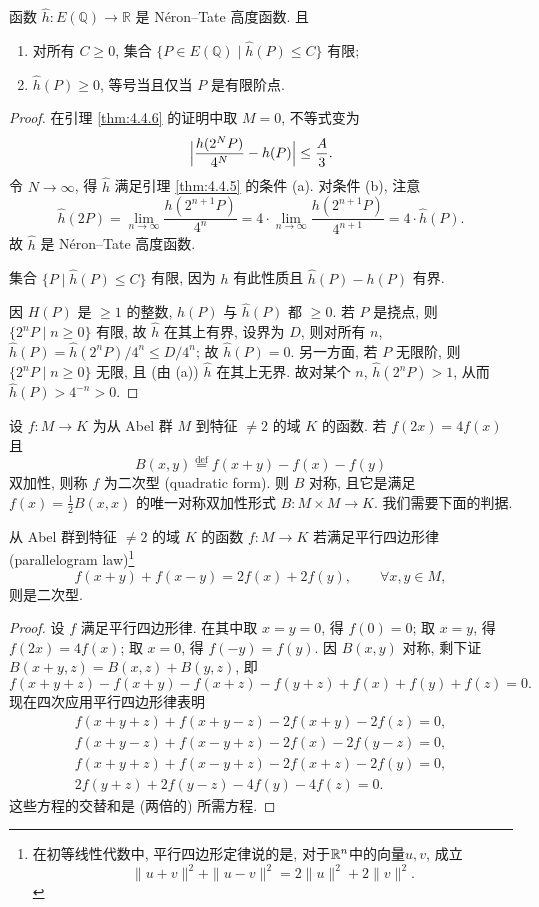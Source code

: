 \begin{theorem} \label{thm:4.4.7} 
函数 $\hat{h}\colon E(\mathbb{Q})\to\mathbb{R}$ 是 N\'eron--Tate 高度函数. 且
\begin{enumerate}[label=\textup{(\alph*)}]
\item 对所有 $C\ge 0$, 集合 $\{P\in E(\mathbb{Q}) \mid \hat{h}(P)\le C\}$ 有限;
\item $\hat{h}(P)\ge 0$, 等号当且仅当 $P$ 是有限阶点.
\end{enumerate}
\end{theorem}

\begin{proof}
在引理 \ref{thm:4.4.6} 的证明中取 $M = 0$, 不等式变为
\[
\Bigl|\frac{h(2^NP)}{4^N} - h(P)\Bigr|\le\frac{A}{3}.
\]
令 $N\to\infty$, 得 $\hat{h}$ 满足引理 \ref{thm:4.4.5} 的条件 (a). 对条件 (b), 注意
\[
\hat{h}(2P) = \lim_{n\to\infty}\frac{h(2^{n+1}P)}{4^n} = 4\cdot\lim_{n\to\infty}\frac{h(2^{n+1}P)}{4^{n+1}} = 4\cdot\hat{h}(P).
\]
故 $\hat{h}$ 是 N\'eron--Tate 高度函数.

集合 $\{P \mid \hat{h}(P)\le C\}$ 有限, 因为 $h$ 有此性质且 $\hat{h}(P) - h(P)$ 有界.

因 $H(P)$ 是 $\ge 1$ 的整数, $h(P)$ 与 $\hat{h}(P)$ 都 $\ge 0$. 若 $P$ 是挠点, 则 $\{2^nP \mid n\ge 0\}$ 有限, 故 $\hat{h}$ 在其上有界, 设界为 $D$, 则对所有 $n$, $\hat{h}(P) = \hat{h}(2^nP)/4^n\le D/4^n$; 故 $\hat{h}(P) = 0$. 另一方面, 若 $P$ 无限阶, 则 $\{2^nP \mid n\ge 0\}$ 无限, 且 (由 (a)) $\hat{h}$ 在其上无界. 故对某个 $n$, $\hat{h}(2^nP) > 1$, 从而 $\hat{h}(P) > 4^{-n} > 0$.
\end{proof}

设 $f\colon M\to K$ 为从 Abel 群 $M$ 到特征 $\neq 2$ 的域 $K$ 的函数. 若 $f(2x) = 4f(x)$ 且
\[
B(x, y) \overset{\text{def}}{=} f(x+y) - f(x) - f(y)
\]
双加性, 则称 $f$ 为二次型 (quadratic form). 则 $B$ 对称, 且它是满足 $f(x) = \frac{1}{2}B(x, x)$ 的唯一对称双加性形式 $B\colon M\times M\to K$. 我们需要下面的判据.

\begin{lemma} \label{thm:4.4.8} 
从 Abel 群到特征 $\neq 2$ 的域 $K$ 的函数 $f\colon M\to K$ 若满足平行四边形律 (parallelogram law)\footnote{在初等线性代数中, 平行四边形定律说的是, 对于$\mathbb{R}^n$中的向量$u,v$, 成立\[\|u+v\|^2 + \|u-v\|^2 = 2\|u\|^2+2\|v\|^2.\]}
\[
f(x+y) + f(x-y) = 2f(x) + 2f(y), \qquad \forall x, y\in M,
\]
则是二次型.
\end{lemma}

\begin{proof}
设 $f$ 满足平行四边形律. 在其中取 $x = y = 0$, 得 $f(0) = 0$; 取 $x = y$, 得 $f(2x) = 4f(x)$; 取 $x = 0$, 得 $f(-y) = f(y)$. 因 $B(x, y)$ 对称, 剩下证 $B(x+y, z) = B(x, z) + B(y, z)$, 即
\[
f(x+y+z) - f(x+y) - f(x+z) - f(y+z) + f(x) + f(y) + f(z) = 0.
\]
现在四次应用平行四边形律表明
\begin{align*}
    f(x+y+z) + f(x+y-z) - 2f(x+y) - 2f(z) = 0,\\
    f(x+y-z) + f(x-y+z) - 2f(x) - 2f(y-z) = 0,\\
    f(x+y+z) + f(x-y+z) - 2f(x+z) - 2f(y) = 0,\\
    2f(y+z) + 2f(y-z) - 4f(y) - 4f(z) = 0.
\end{align*}
这些方程的交替和是 (两倍的) 所需方程.
\end{proof}


